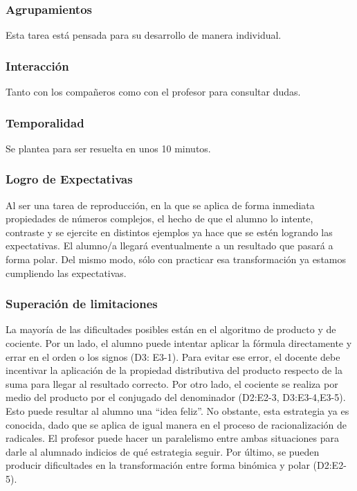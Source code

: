 \documentclass[../main.tex]{memoir}
\begin{document}
\subsubsection{Agrupamientos}
Esta tarea está pensada para su desarrollo de manera individual.


\subsubsection{Interacción}
Tanto con los compañeros como con el profesor para consultar dudas.


\subsubsection{Temporalidad}
Se plantea para ser resuelta en unos 10 minutos.

\subsubsection{Logro de Expectativas}
Al ser una tarea de reproducción, en la que se aplica de forma inmediata propiedades de números complejos, el hecho de que el alumno lo intente, contraste y se ejercite en distintos ejemplos ya hace que se estén logrando las expectativas. El alumno/a llegará eventualmente a un resultado que pasará a forma polar. Del mismo modo, sólo con practicar esa transformación ya estamos cumpliendo las expectativas. 

\subsubsection{Superación de limitaciones}
La mayoría de las dificultades posibles están en el algoritmo de producto y de cociente. Por un lado, el alumno puede intentar aplicar la fórmula directamente y errar en el orden o los signos (D3: E3-1). Para evitar ese error, el docente debe incentivar la aplicación de la propiedad distributiva del producto respecto de la suma para llegar al resultado correcto. Por otro lado, el cociente se realiza por medio del producto por el conjugado del denominador (D2:E2-3, D3:E3-4,E3-5). Esto puede resultar al alumno una ``idea feliz''. No obstante, esta estrategia ya es conocida, dado que se aplica de igual manera en el proceso de racionalización de radicales. El profesor puede hacer un paralelismo entre ambas situaciones para darle al alumnado indicios de qué estrategia seguir. Por último, se pueden producir dificultades en la transformación entre forma binómica y polar (D2:E2-5).
\end{document}
